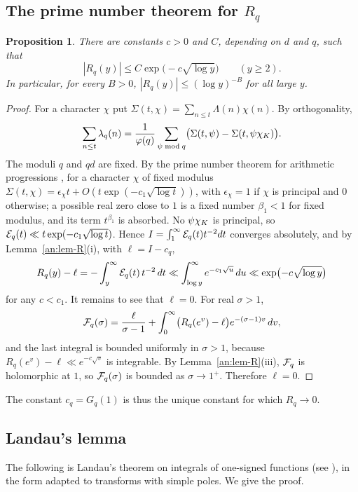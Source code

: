 \documentclass[10pt]{amsart}
\newtheorem{proposition}[theorem]{Proposition}
\theoremstyle{definition}
\theoremstyle{remark}
\begin{document}
\subsection{The prime number theorem for \texorpdfstring{$R_q$}{R\_q}}\label{an:ssec-pnt}
\begin{proposition}\label{an:prop-pnt}
There are constants $c>0$ and $C$, depending on $d$ and $q$, such that
\[
 |R_q(y)|\le C\exp\bigl(-c\sqrt{\log y}\bigr)\qquad(y\ge2).
\]
In particular, for every $B>0$, $|R_q(y)|\le(\log y)^{-B}$ for all large $y$.
\end{proposition}
\begin{proof}
For a character $\chi$ put $\Sigma(t,\chi)=\sum_{n\le t}\Lambda(n)\chi(n)$. By
orthogonality,
\[
 \sum_{n\le t}\lambda_q(n)=\frac1{\varphi(q)}\sum_{\psi\bmod q}\bigl(\Sigma(t,\psi)-\Sigma(t,\psi\chi_K)\bigr).
\]
The moduli $q$ and $qd$ are fixed. By the prime number theorem for
arithmetic progressions \cite[Chapter~20]{Davenport}, for a character $\chi$
of fixed modulus $\Sigma(t,\chi)=\epsilon_\chi t+O(t\exp(-c_1\sqrt{\log t}))$,
with $\epsilon_\chi=1$ if $\chi$ is principal and $0$ otherwise; a possible
real zero close to $1$ is a fixed number $\beta_1<1$ for fixed modulus, and
its term $t^{\beta_1}$ is absorbed. No $\psi\chi_K$ is principal, so
$\mathcal E_q(t)\ll t\exp(-c_1\sqrt{\log t})$. Hence
$I=\int_1^\infty\mathcal E_q(t)t^{-2}dt$ converges absolutely, and by
Lemma~\ref{an:lem-R}(i), with $\ell=I-c_q$,
\[
 R_q(y)-\ell=-\int_y^\infty\mathcal E_q(t)\,t^{-2}\,dt\ll\int_{\log y}^\infty e^{-c_1\sqrt u}\,du\ll\exp\bigl(-c\sqrt{\log y}\bigr)
\]
for any $c<c_1$. It remains to see that $\ell=0$. For real $\sigma>1$,
\[
 \mathcal F_q(\sigma)=\frac{\ell}{\sigma-1}+\int_0^\infty\bigl(R_q(e^{v})-\ell\bigr)e^{-(\sigma-1)v}\,dv ,
\]
and the last integral is bounded uniformly in $\sigma>1$, because
$R_q(e^{v})-\ell\ll e^{-c\sqrt v}$ is integrable. By
Lemma~\ref{an:lem-R}(iii), $\mathcal F_q$ is holomorphic at $1$, so $\mathcal F_q(\sigma)$
is bounded as $\sigma\to1^{+}$. Therefore $\ell=0$.
\end{proof}
The constant $c_q=G_q(1)$ is thus the unique constant for which $R_q\to0$.


\subsection{Landau's lemma}\label{an:ssec-landau}
The following is Landau's theorem on integrals of one-signed functions
(see \cite[\S15.1, Lemma~15.1]{MV}), in the form adapted to transforms with simple
poles. We give the proof.
\end{document}
